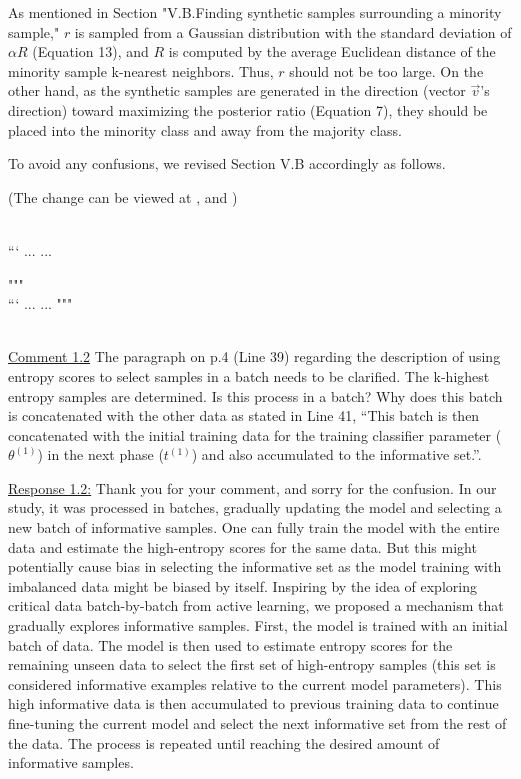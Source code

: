 As mentioned in Section "V.B.Finding synthetic samples surrounding a minority sample," $r$ is sampled from a Gaussian distribution with the standard deviation of $\alpha R$ (Equation 13), and $R$ is computed by the average Euclidean distance of the minority sample k-nearest neighbors. Thus, $r$ should not be too large. On the other hand, as the synthetic samples are generated in the direction (vector $\vec{v}$'s direction) toward maximizing the posterior ratio (Equation 7), they should be placed into the minority class and away from the majority class.

To avoid any confusions, we revised Section V.B accordingly as follows.

\colorbox{marygold}{(The change can be viewed at , and )}\\~

\setcounter{equation}{11}
```
...
...

"""
~\\
```
...
...
"""    


~\\
\color{blue}
\underline{Comment 1.2}
The paragraph on p.4 (Line 39) regarding the description of using entropy scores to select samples in a batch needs to be clarified. The k-highest entropy samples are determined. Is this process in a batch? Why does this batch is concatenated with the other data as stated in Line 41, “This batch is then concatenated with the initial training data for the training classifier parameter ($\theta^{(1)}$) in the next phase ($t^{(1)}$) and also accumulated to the informative set.”.

\color{black}
\underline{Response 1.2:}
Thank you for your comment, and sorry for the confusion. In our study, it was processed in batches, gradually updating the model and selecting a new batch of informative samples. One can fully train the model with the entire data and estimate the high-entropy scores for the same data. But this might potentially cause bias in selecting the informative set as the model training with imbalanced data might be biased by itself. Inspiring by the idea of exploring critical data batch-by-batch from active learning, we proposed a mechanism that gradually explores informative samples. First, the model is trained with an initial batch of data. The model is then used to estimate entropy scores for the remaining unseen data to select the first set of high-entropy samples (this set is considered informative examples relative to the current model parameters). This high informative data is then accumulated to previous training data to continue fine-tuning the current model and select the next informative set from the rest of the data. The process is repeated until reaching the desired amount of informative samples. 

